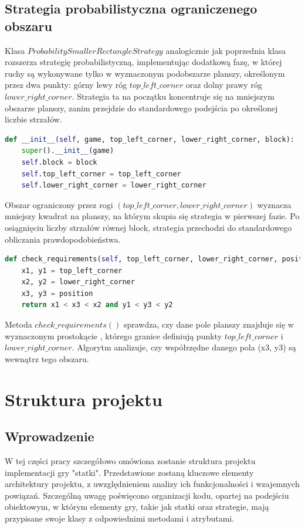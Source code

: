 \documentclass[magisterska]{pracadypl}
\begin{document}
\section{Strategia probabilistyczna ograniczenego obszaru}
Klasa $ProbabilitySmallerRectangleStrategy$ analogicznie jak poprzednia klasa rozszerza strategię probabilistyczną, implementując dodatkową fazę, w której ruchy są wykonywane tylko w wyznaczonym podobszarze planszy, określonym przez dwa punkty: górny lewy róg $top\_left\_corner$ oraz dolny prawy róg $lower\_right\_corner$. Strategia ta na początku koncentruje się na mniejszym obszarze planszy, zanim przejdzie do standardowego podejścia po określonej liczbie strzałów.
\begin{lstlisting}[language=Python ,caption = Konstruktor klasy ProbabilitySmallerRectangleStrategy]
def __init__(self, game, top_left_corner, lower_right_corner, block):
    super().__init__(game)
    self.block = block
    self.top_left_corner = top_left_corner
    self.lower_right_corner = lower_right_corner
\end{lstlisting}
Obszar ograniczony przez rogi $(top\_left\_corner, lower\_right\_corner)$ wyznacza mniejszy kwadrat na planszy, na którym skupia się strategia w pierwszej fazie. Po osiągnięciu liczby strzałów równej block, strategia przechodzi do standardowego obliczania prawdopodobieństwa.
\begin{lstlisting}[language=Python,caption = Metoda sprawdzajajaca warunek ogranioczonego obszaru z klasy ProbabilitySmallerRectangleStrategy]
def check_requirements(self, top_left_corner, lower_right_corner, position):
    x1, y1 = top_left_corner
    x2, y2 = lower_right_corner
    x3, y3 = position
    return x1 < x3 < x2 and y1 < y3 < y2
\end{lstlisting}
Metoda $check\_requirements()$ sprawdza, czy dane pole planszy znajduje się w wyznaczonym prostokącie , którego granice definiują punkty $top\_left\_corner$ i $lower\_right\_corner$. Algorytm analizuje, czy współrzędne danego pola (x3, y3) są wewnątrz tego obszaru.             
\chapter{Struktura projektu}
\section{Wprowadzenie}
W tej części pracy szczegółowo omówiona zostanie struktura projektu implementacji gry "statki". Przedstawione zostaną kluczowe elementy architektury projektu, z uwzględnieniem analizy ich funkcjonalności i wzajemnych powiązań. Szczególną uwagę poświęcono organizacji kodu, opartej na podejściu obiektowym, w którym elementy gry, takie jak statki oraz strategie, mają przypisane swoje klasy z odpowiednimi metodami i atrybutami.
\end{document}
